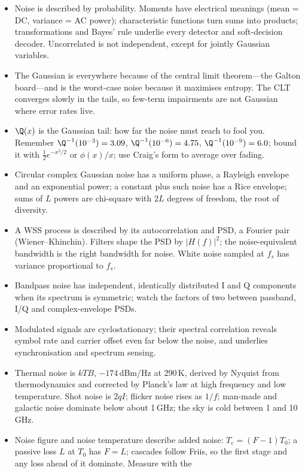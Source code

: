 \begin{itemize}
\item Noise is described by probability. Moments have electrical meanings (mean = DC, variance = AC power);
characteristic functions turn sums into products; transformations and Bayes' rule underlie every detector
and soft-decision decoder. Uncorrelated is not independent, except for jointly Gaussian variables.
\item The Gaussian is everywhere because of the central limit theorem---the Galton board---and is the
worst-case noise because it maximises entropy. The CLT converges slowly in the tails, so few-term
impairments are not Gaussian where error rates live.
\item $\Q(x)$ is the Gaussian tail: how far the noise must reach to fool you. Remember
$\Q^{-1}(10^{-3})=3.09$, $\Q^{-1}(10^{-6})=4.75$, $\Q^{-1}(10^{-9})=6.0$; bound it with
$\tfrac12e^{-x^2/2}$ or $\phi(x)/x$; use Craig's form to average over fading.
\item Circular complex Gaussian noise has a uniform phase, a Rayleigh envelope and an exponential power; a
constant plus such noise has a Rice envelope; sums of $L$ powers are chi-square with $2L$ degrees of
freedom, the root of diversity.
\item A WSS process is described by its autocorrelation and PSD, a Fourier pair (Wiener--Khinchin). Filters
shape the PSD by $|H(f)|^2$; the noise-equivalent bandwidth is the right bandwidth for noise. White noise
sampled at $f_s$ has variance proportional to $f_s$.
\item Bandpass noise has independent, identically distributed I and Q components when its spectrum is
symmetric; watch the factors of two between passband, I/Q and complex-envelope PSDs.
\item Modulated signals are cyclostationary; their spectral correlation reveals symbol rate and carrier
offset even far below the noise, and underlies synchronisation and spectrum sensing.
\item Thermal noise is $kTB$, $-174$\,dBm/Hz at 290\,K, derived by Nyquist from thermodynamics and corrected
by Planck's law at high frequency and low temperature. Shot noise is $2qI$; flicker noise rises as $1/f$;
man-made and galactic noise dominate below about 1\,GHz; the sky is cold between 1 and 10\,GHz.
\item Noise figure and noise temperature describe added noise: $T_e=(F-1)T_0$; a passive loss $L$ at $T_0$
has $F=L$; cascades follow Friis, so the first stage and any loss ahead of it dominate. Measure with the

\end{itemize}
